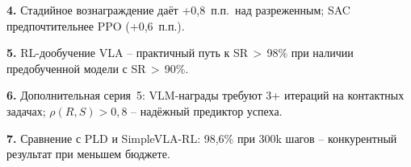     \textbf{4.} Стадийное вознаграждение даёт +0,8~п.п.\ над разреженным; SAC предпочтительнее PPO (+0,6~п.п.).

    \textbf{5.} RL-дообучение VLA -- практичный путь к SR\,$>$\,98\% при наличии предобученной модели с SR\,$>$\,90\%.

    \textbf{6.} Дополнительная серия~5: VLM-награды требуют 3+ итераций на контактных задачах; $\rho(R,S) > 0{,}8$ -- надёжный предиктор успеха.

    \textbf{7.} Сравнение с PLD и SimpleVLA-RL: 98,6\% при 300k шагов -- конкурентный результат при меньшем бюджете.

\endinput
